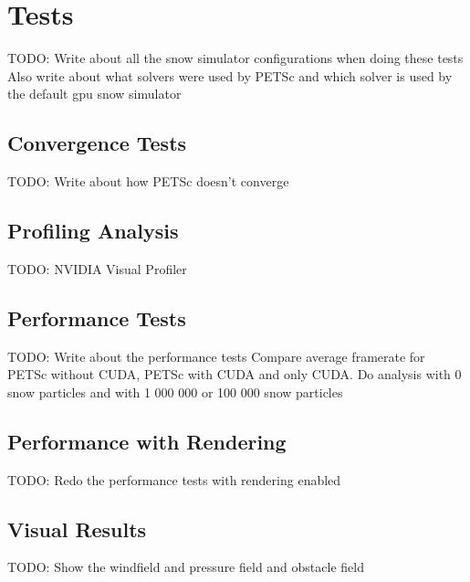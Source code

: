 \section{Tests}

TODO: Write about all the snow simulator configurations when doing these tests
Also write about what solvers were used by PETSc and which solver is used
by the default gpu snow simulator

\subsection{Convergence Tests}

TODO: Write about how PETSc doesn't converge

\subsection{Profiling Analysis}

TODO: NVIDIA Visual Profiler

\subsection{Performance Tests}

TODO: Write about the performance tests
Compare average framerate for PETSc without CUDA, PETSc with CUDA and only CUDA.
Do analysis with 0 snow particles and with 1 000 000 or 100 000 snow particles 

\subsection{Performance with Rendering}

TODO: Redo the performance tests with rendering enabled

\subsection{Visual Results}

TODO: Show the windfield and pressure field and obstacle field
